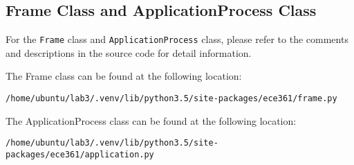 \documentclass[11pt]{article}
\begin{document}
\subsection{Frame Class and ApplicationProcess Class}

For the \texttt{Frame} class and \texttt{ApplicationProcess} class, please refer to the comments and descriptions in the source code for detail information.

\noindent The Frame class can be found at the following location:

\noindent\texttt{/home/ubuntu/lab3/.venv/lib/python3.5/site-packages/ece361/frame.py}

\noindent The ApplicationProcess class can be found at the following location:

\noindent\texttt{/home/ubuntu/lab3/.venv/lib/python3.5/site-packages/ece361/application.py}
\end{document}
